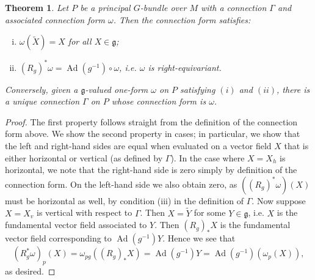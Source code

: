 \documentclass{book}
\newcommand{\fr}{\mathfrak}
\DeclareMathOperator{\Ad}{Ad}
\theoremstyle{plain}
\newtheorem{thm}{Theorem}
\theoremstyle{definition}
\theoremstyle{remark}
\begin{document}
\begin{thm}
Let $P$ be a principal $G$-bundle over $M$ with a connection $\Gamma$ and associated connection form $\omega$. Then the connection form satisfies:
\begin{enumerate}[(i)]
\item $\omega(\tilde X)=X$ for all $X\in\fr g$;
\item $(R_g)^*\omega=\Ad(g^{-1})\circ \omega$, i.e. $\omega$ is right-equivariant.
\end{enumerate}

Conversely, given a $\fr g$-valued one-form $\omega$ on $P$ satisfying $(i)$ and $(ii)$,
there is a unique connection $\Gamma$ on $P$ whose connection form is $\omega$.
\end{thm}
\begin{proof}
The first property follows straight from the definition of the connection form above.
We show the second property in cases; in particular, we show that the left and right-hand sides are equal when evaluated on a vector field $X$ that is either horizontal or vertical (as defined by $\Gamma$).
In the case where $X=X_h$ is horizontal, we note that the right-hand side is zero simply by definition of the connection form.
On the left-hand side we also obtain zero, as $((R_g)^*\omega)(X)$ must be horizontal as well, by condition (iii) in the definition of $\Gamma$.
Now suppose $X=X_v$ is vertical with respect to $\Gamma$. Then $X=\tilde Y$ for some $Y\in\fr g$, i.e. $X$ is the fundamental vector field associated to $Y$.
Then $(R_g)_*X$ is the fundamental vector field corresponding to $\Ad(g^{-1})Y$.
 Hence we see that
\[(R_g^*\omega)_p(X)=\omega_{pg}((R_g)_*X)=\Ad(g^{-1})Y=\Ad(g^{-1})(\omega_p(X)),\]
as desired.


\end{proof}
\end{document}
